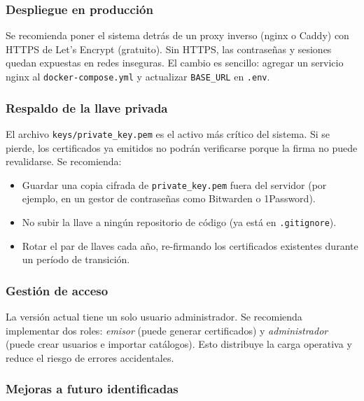 \documentclass[11pt,letterpaper]{article}
\begin{document}
\subsubsection{Despliegue en producci\'on}

Se recomienda poner el sistema detr\'as de un proxy inverso (nginx o Caddy) con
HTTPS de Let's Encrypt (gratuito). Sin HTTPS, las contrase\~nas y sesiones quedan
expuestas en redes inseguras. El cambio es sencillo: agregar un servicio nginx al
\texttt{docker-compose.yml} y actualizar \texttt{BASE\_URL} en \texttt{.env}.

\subsubsection{Respaldo de la llave privada}

El archivo \texttt{keys/private\_key.pem} es el activo m\'as cr\'itico del sistema.
Si se pierde, los certificados ya emitidos no podr\'an verificarse porque la firma
no puede revalidarse. Se recomienda:

\begin{itemize}
  \item Guardar una copia cifrada de \texttt{private\_key.pem} fuera del servidor
        (por ejemplo, en un gestor de contrase\~nas como Bitwarden o 1Password).
  \item No subir la llave a ning\'un repositorio de c\'odigo (ya est\'a en
        \texttt{.gitignore}).
  \item Rotar el par de llaves cada a\~no, re-firmando los certificados existentes
        durante un per\'iodo de transici\'on.
\end{itemize}

\subsubsection{Gesti\'on de acceso}

La versi\'on actual tiene un solo usuario administrador. Se recomienda implementar
dos roles: \textit{emisor} (puede generar certificados) y \textit{administrador}
(puede crear usuarios e importar cat\'alogos). Esto distribuye la carga operativa y
reduce el riesgo de errores accidentales.

\subsubsection{Mejoras a futuro identificadas}
\end{document}
